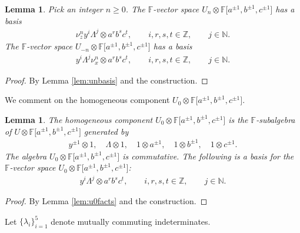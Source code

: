 \documentclass[pdftex]{sigma}
\numberwithin{equation}{section}
\newtheorem{Lemma}[Theorem]{Lemma}
\begin{document}
\begin{Lemma}
\label{lem:gradingbasis}
Pick an integer $n\geq 0$. The $\mathbb F$-vector space
$U_n \otimes
\mathbb F \lbrack a^{\pm 1}, b^{\pm 1}, c^{\pm 1}\rbrack $ has
a basis
\begin{gather*}
\nu^n_z y^i \Lambda^j
\otimes a^rb^sc^t,
 \qquad i,r,s,t\in \mathbb Z, \qquad j\in \mathbb N.
\end{gather*}
The $\mathbb F$-vector space $U_{-n} \otimes {\mathbb F}\lbrack a^{\pm 1}, b^{\pm 1}, c^{\pm 1} \rbrack$ has a basis
\begin{gather*}
y^i \Lambda^j \nu^n_x
\otimes a^rb^sc^t,
 \qquad i,r,s,t\in \mathbb Z,  \qquad j\in \mathbb N.
\end{gather*}
\end{Lemma}
\begin{proof}
By Lemma
\ref{lem:unbasis}
and the construction.
\end{proof}

We comment on the homogeneous component
$U_0 \otimes
\mathbb F \lbrack a^{\pm 1}, b^{\pm 1}, c^{\pm 1}\rbrack $.

\begin{Lemma}
\label{lem:u0tensor}
The homogeneous component
$U_0 \otimes
\mathbb F \lbrack a^{\pm 1}, b^{\pm 1}, c^{\pm 1}\rbrack $
is the $\mathbb F$-subalgebra of
$
U
\otimes
\mathbb F \lbrack a^{\pm 1}, b^{\pm 1}, c^{\pm 1}\rbrack $
generated by
\begin{gather*}
y^{\pm 1}\otimes 1,\quad
\Lambda \otimes 1, \quad
1\otimes a^{\pm 1},
\quad
1\otimes b^{\pm 1},
\quad
1\otimes c^{\pm 1}.
\end{gather*}
The algebra
$U_0 \otimes
\mathbb F \lbrack a^{\pm 1}, b^{\pm 1}, c^{\pm 1}\rbrack $
is commutative.
The following is a basis for the
$\mathbb F$-vector space
$U_0 \otimes
\mathbb F \lbrack a^{\pm 1}, b^{\pm 1}, c^{\pm 1}\rbrack $:
\begin{gather*}
y^i \Lambda^j\otimes a^r b^s c^t, \qquad i,r,s,t\in \mathbb Z, \qquad j\in \mathbb N.
\end{gather*}
\end{Lemma}
\begin{proof}
By Lemma
\ref{lem:u0facts} and the construction.
\end{proof}

 Let $\lbrace \lambda_i\rbrace_{i=1}^5 $ denote mutually
commuting indeterminates.
\end{document}

